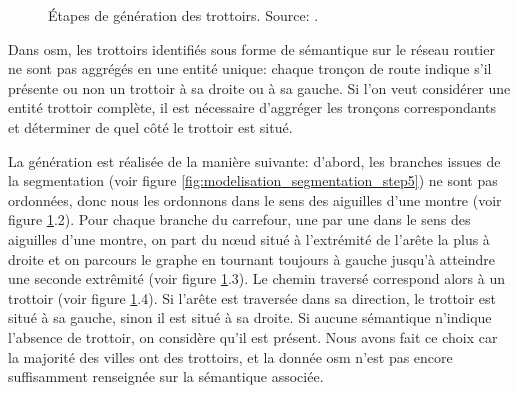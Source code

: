 \begin{figure}
    \centering
    \caption{Étapes de génération des trottoirs. Source: \cite{Kalsron2022}.}
    \label{fig:modelisation_calcul_pieton_trottoirs}
\end{figure}

Dans \gls{osm}, les trottoirs identifiés sous forme de sémantique sur le réseau routier ne sont pas aggrégés en une entité unique: chaque tronçon de route indique s'il présente ou non un trottoir à sa droite ou à sa gauche. Si l'on veut considérer une entité trottoir complète, il est nécessaire d'aggréger les tronçons correspondants et déterminer de quel côté le trottoir est situé.

La génération est réalisée de la manière suivante: d'abord, les branches issues de la segmentation (voir figure \ref{fig:modelisation_segmentation_step5}) ne sont pas ordonnées, donc nous les ordonnons dans le sens des aiguilles d'une montre (voir figure \ref{fig:modelisation_calcul_pieton_trottoirs}.2). Pour chaque branche du carrefour, une par une dans le sens des aiguilles d'une montre, on part du nœud situé à l'extrémité de l'arête la plus à droite et on parcours le graphe en tournant toujours à gauche jusqu'à atteindre une seconde extrêmité (voir figure \ref{fig:modelisation_calcul_pieton_trottoirs}.3). Le chemin traversé correspond alors à un trottoir (voir figure \ref{fig:modelisation_calcul_pieton_trottoirs}.4). Si l'arête est traversée dans sa direction, le trottoir est situé à sa gauche, sinon il est situé à sa droite. Si aucune sémantique n'indique l'absence de trottoir, on considère qu'il est présent. Nous avons fait ce choix car la majorité des villes ont des trottoirs, et la donnée \gls{osm} n'est pas encore suffisamment renseignée sur la sémantique associée.

